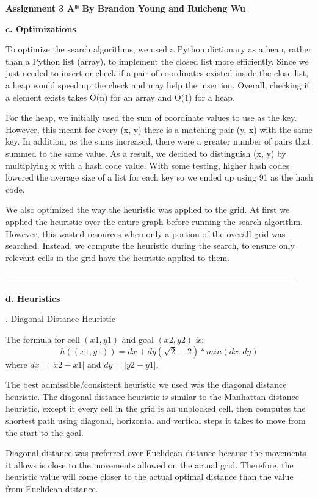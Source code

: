 \documentclass[12pt, letterpaper]{article}
\begin{document}
\noindent\textbf{\large Assignment 3 A*}\newline
\textbf{By Brandon Young and Ruicheng Wu}

\bigskip

\noindent \textbf{c. Optimizations}

To optimize the search algorithms, we used a Python dictionary as a heap, rather than a Python list (array), to implement the closed list more efficiently. Since we just needed to insert or check if a pair of coordinates existed inside the close list, a heap would speed up the check and may help the insertion. Overall, checking if a element exists takes O(n) for an array and O(1) for a heap.

For the heap, we initially used the sum of coordinate values to use as the key. However, this meant for every (x, y) there is a matching pair (y, x) with the same key. In addition, as the sums increased, there were a greater number of pairs that summed to the same value. As a result, we decided to distinguish (x, y) by multiplying x with a hash code value. With some testing, higher hash codes lowered the average size of a list for each key so we ended up using 91 as the hash code. 

We also optimized the way the heuristic was applied to the grid. At first we applied the heuristic over the entire graph before running the search algorithm. However, this wasted resources when only a portion of the overall grid was searched. Instead, we compute the heuristic during the search, to ensure only relevant cells in the grid have the heuristic applied to them.

\bigskip
\noindent------------------------------------------------------------------------------------------------------

\noindent \textbf{d. Heuristics}

. Diagonal Distance Heuristic

The formula for cell $(x1,y1)$ and goal $(x2, y2)$ is:
$$h((x1, y1)) = dx + dy (\sqrt{2} - 2) * min(dx, dy)$$
where $dx = |x2 - x1|$ and $dy = |y2 - y1|$.

The best admissible/consistent heuristic we used was the diagonal distance heuristic. The diagonal distance heuristic is similar to the Manhattan distance heuristic, except it every cell in the grid is an unblocked cell, then computes the shortest path using diagonal, horizontal and vertical steps it takes to move from the start to the goal. 

Diagonal distance was preferred over Euclidean distance because the movements it allows is close to the movements allowed on the actual grid. Therefore, the heuristic value will come closer to the actual optimal distance than the value from Euclidean distance.
\end{document}
